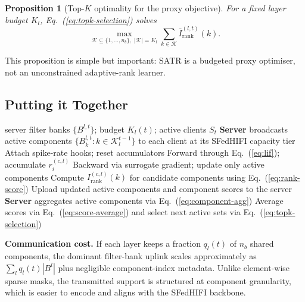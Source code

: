 \documentclass{article} %
\newcommand{\method}{SATR\xspace}
\newcommand{\methodbf}{\textbf{SATR}}
\newtheorem{proposition}{Proposition}
\begin{document}
\begin{proposition}[Top-$K$ optimality for the proxy objective]
\label{prop:topk}
For a fixed layer budget $K_l$, Eq.~(\ref{eq:topk-selection}) solves
\begin{equation}
\max_{\mathcal{K}\subseteq\{1,\dots,n_b\},\; |\mathcal{K}|=K_l}\sum_{k\in\mathcal{K}}\bar I_{\text{rank}}^{(l,t)}(k).
\label{eq:proxy-objective}
\end{equation}
\end{proposition}
This proposition is simple but important: \method is a budgeted proxy optimiser, not an unconstrained adaptive-rank learner.

\subsection{Putting it Together}
\label{sec:method-algo}

\begin{algorithm}[t]
\caption{\methodbf (one communication round)}
\label{alg:satr}
\small
\begin{algorithmic}[1]
\Require server filter banks $\{B^{l,t}\}$; budget $K_l(t)$; active clients $S_t$
\State \textbf{Server} broadcasts active components $\{B_k^{l,t}:k\in\mathcal{K}_l^{t-1}\}$ to each client at its SFedHIFI capacity tier
    \State Attach spike-rate hooks; reset accumulators
        \State Forward through Eq.~(\ref{eq:lif}); accumulate $r_i^{(c,l)}$
        \State Backward via surrogate gradient; update only active components
    \EndFor
    \State Compute $I_{\text{rank}}^{(c,l)}(k)$ for candidate components using Eq.~(\ref{eq:rank-score})
    \State Upload updated active components and component scores to the server
\EndFor
\State \textbf{Server} aggregates active components via Eq.~(\ref{eq:component-agg})
\State Average scores via Eq.~(\ref{eq:score-average}) and select next active sets via Eq.~(\ref{eq:topk-selection})
\end{algorithmic}
\end{algorithm}

\textbf{Communication cost.} If each layer keeps a fraction $q_l(t)$ of $n_b$ shared components, the dominant filter-bank uplink scales approximately as $\sum_l q_l(t)|B^l|$ plus negligible component-index metadata. Unlike element-wise sparse masks, the transmitted support is structured at component granularity, which is easier to encode and aligns with the SFedHIFI backbone.
\end{document}
